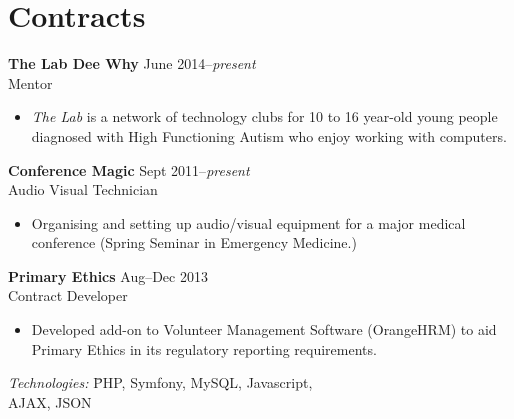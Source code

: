
\section*{Contracts}
\vspace{-0.2cm}

\textbf{The Lab Dee Why} \tabto{9.5cm} June 2014--\textit{present} \\
Mentor
\begin{itemize}
\item \textit{The Lab} is a network of technology clubs for 10 to 16 year-old 
young people diagnosed with High Functioning 
Autism who enjoy working with computers. 
\end{itemize}

\textbf{Conference Magic} \tabto{9.5cm} Sept 2011--\textit{present} \\
Audio Visual Technician
\begin{itemize}
\item Organising and setting up audio/visual equipment for 
a major medical conference (Spring Seminar in Emergency Medicine.) 
\end{itemize}

\textbf{Primary Ethics} \tabto{9.5cm} Aug--Dec 2013\\
Contract Developer
\begin{itemize}
\item Developed add-on to Volunteer Management Software (OrangeHRM) to aid 
Primary Ethics in its regulatory reporting requirements.\\
\end{itemize}
\vspace{-1.180cm}
\begin{tabbing}
\textit{Technologies:} \= PHP, Symfony, MySQL, Javascript,\\
                      \>AJAX, JSON
\end{tabbing}


